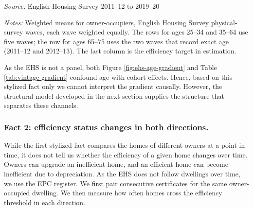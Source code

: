 \begin{table}[h]
  \centering
  \caption{Energy efficiency and dwelling vintage by age, owner-occupiers}
  \label{tab:vintage-gradient}
  \begin{threeparttable}
    \begin{tablenotes}[flushleft]\footnotesize
      \item \textit{Source:} English Housing Survey 2011--12 to 2019--20
      \item \textit{Notes:}  Weighted means for owner-occupiers, English
      Housing Survey physical-survey waves, each wave weighted equally. The
      rows for ages 25--34 and 35--64 use five waves; the row for ages  65--75
      uses the two waves that record exact age (2011--12 and 2012--13). The
      last column is the efficiency target in estimation.
    \end{tablenotes}
  \end{threeparttable}
\end{table}

As the EHS is not a panel, both Figure \ref{fig:ehs-age-gradient} and Table \ref{tab:vintage-gradient} confound age with cohort effects. Hence, based on this stylized fact only we cannot interpret the gradient
causally. However,  the structural model developed in the next section supplies the structure that separates these channels.

\subsubsection{Fact 2: efficiency status changes in both directions.}\label{sec:data-transitions}


While the  first stylized fact compares the homes of different owners at a point in time, it does not tell us whether the efficiency of a given home changes over time.  Owners can upgrade an inefficient home, and an efficient home can become inefficient due to depreciation. As the EHS does not follow dwellings over time, we use the EPC register. We first pair consecutive certificates for the
same owner-occupied dwelling.  We then measure how often homes cross the
efficiency threshold in each direction.


